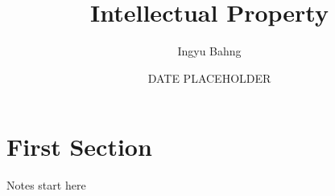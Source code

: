 \documentclass[10pt]{article}
\title{Intellectual Property}
\date{DATE PLACEHOLDER}
\author{Ingyu Bahng}
\begin{document}


\section{First Section}

Notes start here
  
\end{document}
